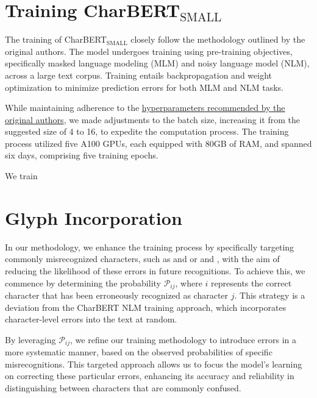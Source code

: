 \section{Training CharBERT$_{\text{SMALL}}$}
\label{sec:4_training_charbert_small}
The training of CharBERT$_{\text{SMALL}}$ closely follow the methodology outlined by the original authors. The model undergoes training using pre-training objectives, specifically masked language modeling (MLM) and noisy language model (NLM), across a large text corpus. Training entails backpropagation and weight optimization to minimize prediction errors for both MLM and NLM tasks.

While maintaining adherence to the \href{https://github.com/mawentao277/CharBERT/blob/main/shell/mlm.sh}{hyperparameters recommended by the original authors}, we made adjustments to the batch size, increasing it from the suggested size of 4 to 16, to expedite the computation process. The training process utilized five A100 GPUs, each equipped with 80GB of RAM, and spanned six days, comprising five training epochs.

We train 
\section{Glyph Incorporation}
\label{sec:3_glyph_incorporation}
In our methodology, we enhance the training process by specifically targeting commonly misrecognized characters, such as  and \say{,} or  and , with the aim of reducing the likelihood of these errors in future recognitions. To achieve this, we commence by determining the probability $\mathcal{P}_{ij}$, where $i$ represents the correct character that has been erroneously recognized as character $j$. This strategy is a deviation from the CharBERT NLM training approach, which incorporates character-level errors into the text at random.

By leveraging $\mathcal{P}_{ij}$, we refine our training methodology to introduce errors in a more systematic manner, based on the observed probabilities of specific misrecognitions. This targeted approach allows us to focus the model's learning on correcting these particular errors, enhancing its accuracy and reliability in distinguishing between characters that are commonly confused.

